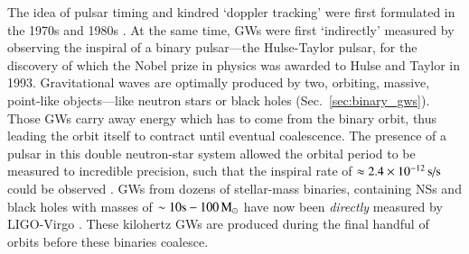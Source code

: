 \documentclass[onecolumn,authoryear]{els-mrw}
\begin{document}
The idea of pulsar timing and kindred `doppler tracking' were first formulated in the 1970s and 1980s \citep{Estabrook+Wahlquist-1975, Sazhin-1978, Detweiler-1979, Hellings+Downs-1983}.  At the same time, GWs were first `indirectly' measured by observing the inspiral of a binary pulsar---the Hulse-Taylor pulsar, for the discovery of which the Nobel prize in physics was awarded to Hulse and Taylor in 1993.  Gravitational waves are optimally produced by two, orbiting, massive, point-like objects---like neutron stars or black holes (Sec.~\ref{sec:binary_gws}).  Those GWs carry away energy which has to come from the binary orbit, thus leading the orbit itself to contract until eventual coalescence.  The presence of a pulsar in this double neutron-star system allowed the orbital period to be measured to incredible precision, such that the inspiral rate of $\approx 2.4\times\nobreak10^{-12} \, \textrm{s/s}$ could be observed \citep{Weisberg+2010}.  GWs from dozens of stellar-mass binaries, containing NSs and black holes with masses of $\sim 10\rm{s} - 100 \, \textrm{M}_{\odot}$ have now been \textit{directly} measured by LIGO-Virgo \citep{LVK-2023}.  These kilohertz GWs are produced during the final handful of orbits before these binaries coalesce.
\end{document}

